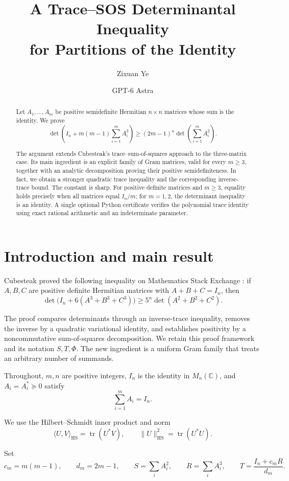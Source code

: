 \documentclass[11pt]{article}
\title{\textbf{A Trace--SOS Determinantal Inequality\\
for Partitions of the Identity}}
\author{Zixuan Ye \and GPT-6 Astra}
\date{}
\newcommand{\tr}{\operatorname{tr}}
\newcommand{\HS}{\mathrm{HS}}
\newcommand{\Id}{I_n}
\newcommand{\ip}[2]{\langle #1,#2\rangle}
\newcommand{\nrm}[1]{\lVert #1\rVert}
\begin{document}
\maketitle
\begin{abstract}
Let \(A_1,\ldots,A_m\) be positive semidefinite Hermitian \(n\times n\)
matrices whose sum is the identity. We prove
\[
 \det\!\left(\Id+m(m-1)\sum_{i=1}^m A_i^3\right)
 \ge (2m-1)^n\det\!\left(\sum_{i=1}^m A_i^2\right).
\]

The argument extends Cubesteak's trace--sum-of-squares approach to the
three-matrix case. Its main ingredient is an explicit family of Gram
matrices, valid for every \(m\ge3\), together with an analytic
decomposition proving their positive semidefiniteness. In fact, we obtain
a stronger quadratic trace inequality and the corresponding inverse-trace
bound. The constant is sharp. For positive definite matrices and
\(m\ge3\), equality holds precisely when all matrices equal \(\Id/m\);
for \(m=1,2\), the determinant inequality is an identity. A single
optional Python certificate verifies the polynomial trace identity
using exact rational arithmetic and an indeterminate parameter.
\end{abstract}

\section{Introduction and main result}

Cubesteak proved the following inequality on Mathematics Stack Exchange
\cite{cubesteak}: if \(A,B,C\) are positive definite Hermitian matrices
with \(A+B+C=\Id\), then
\[
 \det\!\bigl(\Id+6(A^3+B^3+C^3)\bigr)
 \ge 5^n\det(A^2+B^2+C^2).
\]

The proof compares determinants through an inverse-trace inequality,
removes the inverse by a quadratic variational identity, and establishes
positivity by a noncommutative sum-of-squares decomposition.
We retain this proof framework and its notation \(S,T,\Phi\).
The new ingredient is a uniform Gram family that treats an arbitrary
number of summands.

Throughout, \(m,n\) are positive integers, \(\Id\) is the identity in
\(M_n(\mathbb C)\), and \(A_i=A_i^*\succeq0\) satisfy
\[
 \sum_{i=1}^m A_i=\Id.
\]

We use the Hilbert--Schmidt inner product and norm
\[
 \ip{U}{V}_{\HS}=\tr(U^*V),\qquad
 \nrm{U}_{\HS}^2=\tr(U^*U).
\]

Set
\begin{equation}\label{eq:ST}
 c_m=m(m-1),\qquad d_m=2m-1,\qquad
 S=\sum_i A_i^2,\qquad R=\sum_i A_i^3,\qquad
 T=\frac{\Id+c_mR}{d_m}.
\end{equation}
\end{document}
